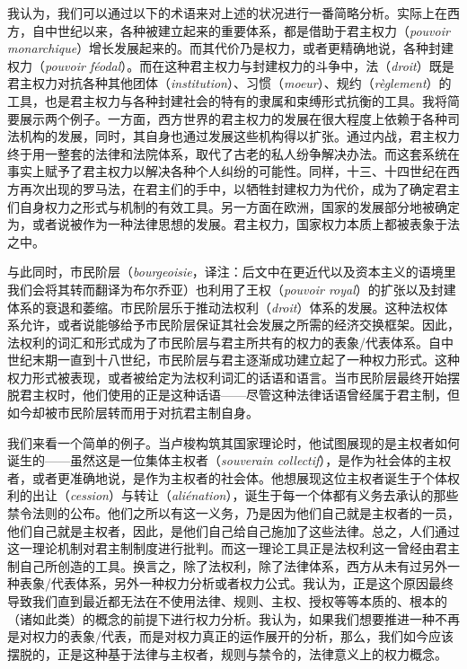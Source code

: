 \documentclass[fontset=fandol, a4paper, 12pt, twoside]{ctexart}
\newcommand{\fr}[1]{\textit{#1}}
\begin{document}
我认为，我们可以通过以下的术语来对上述的状况进行一番简略分析。实际上在西方，自中世纪以来，各种被建立起来的重要体系，都是借助于君主权力（\fr{pouvoir monarchique}）增长发展起来的。而其代价乃是权力，或者更精确地说，各种封建权力（\fr{pouvoir féodal}）。而在这种君主权力与封建权力的斗争中，法（\fr{droit}）既是君主权力对抗各种其他团体（\fr{institution}）、习惯（\fr{moeur}）、规约（\fr{règlement}）的工具，也是君主权力与各种封建社会的特有的隶属和束缚形式抗衡的工具。我将简要展示两个例子。一方面，西方世界的君主权力的发展在很大程度上依赖于各种司法机构的发展，同时，其自身也通过发展这些机构得以扩张。通过内战，君主权力终于用一整套的法律和法院体系，取代了古老的私人纷争解决办法。而这套系统在事实上赋予了君主权力以解决各种个人纠纷的可能性。同样，十三、十四世纪在西方再次出现的罗马法，在君主们的手中，以牺牲封建权力为代价，成为了确定君主们自身权力之形式与机制的有效工具。另一方面在欧洲，国家的发展部分地被确定为，或者说被作为一种法律思想的发展。君主权力，国家权力本质上都被表象于法之中。

与此同时，市民阶层（\fr{bourgeoisie}，译注：后文中在更近代以及资本主义的语境里我们会将其转而翻译为布尔乔亚）也利用了王权（\fr{pouvoir royal}）的扩张以及封建体系的衰退和萎缩。市民阶层乐于推动法权利（\fr{droit}）体系的发展。这种法权体系允许，或者说能够给予市民阶层保证其社会发展之所需的经济交换框架。因此，法权利的词汇和形式成为了市民阶层与君主所共有的权力的表象/代表体系。自中世纪末期一直到十八世纪，市民阶层与君主逐渐成功建立起了一种权力形式。这种权力形式被表现，或者被给定为法权利词汇的话语和语言。当市民阶层最终开始摆脱君主权时，他们使用的正是这种话语——尽管这种法律话语曾经属于君主制，但如今却被市民阶层转而用于对抗君主制自身。

我们来看一个简单的例子。当卢梭构筑其国家理论时，他试图展现的是主权者如何诞生的——虽然这是一位集体主权者（\fr{souverain collectif}），是作为社会体的主权者，或者更准确地说，是作为主权者的社会体。他想展现这位主权者诞生于个体权利的出让（\fr{cession}）与转让（\fr{aliénation}），诞生于每一个体都有义务去承认的那些禁令法则的公布。他们之所以有这一义务，乃是因为他们自己就是主权者的一员，他们自己就是主权者，因此，是他们自己给自己施加了这些法律。总之，人们通过这一理论机制对君主制制度进行批判。而这一理论工具正是法权利这一曾经由君主制自己所创造的工具。换言之，除了法权利，除了法律体系，西方从未有过另外一种表象/代表体系，另外一种权力分析或者权力公式。我认为，正是这个原因最终导致我们直到最近都无法在不使用法律、规则、主权、授权等等本质的、根本的（诸如此类）的概念的前提下进行权力分析。我认为，如果我们想要推进一种不再是对权力的表象/代表，而是对权力真正的运作展开的分析，那么，我们如今应该摆脱的，正是这种基于法律与主权者，规则与禁令的，法律意义上的权力概念。
\end{document}
